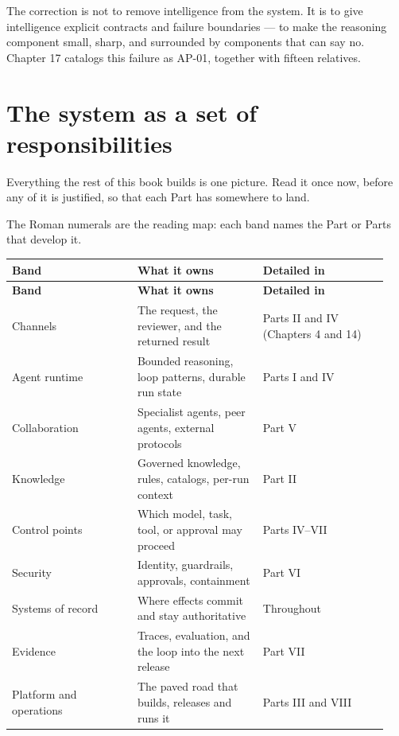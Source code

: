 The correction is not to remove intelligence from the system. It is to give intelligence explicit contracts and failure boundaries — to make the reasoning component small, sharp, and surrounded by components that can say no. Chapter 17 catalogs this failure as AP-01, together with fifteen relatives.\par

\section{The system as a set of responsibilities}

Everything the rest of this book builds is one picture. Read it once now, before any of it is justified, so that each Part has somewhere to land.\par


The Roman numerals are the reading map: each band names the Part or Parts that develop it.\par

\BookTableStart
\small
\begin{longtable}{@{}Y{0.3133\linewidth}Y{0.3133\linewidth}Y{0.3133\linewidth}@{}}
\color{white}\bfseries Band & \color{white}\bfseries What it owns & \color{white}\bfseries Detailed in \\
\endfirsthead
{}
\color{white}\bfseries Band & \color{white}\bfseries What it owns & \color{white}\bfseries Detailed in \\
\endhead
Channels & The request, the reviewer, and the returned result & Parts II and IV (Chapters 4 and 14) \\
Agent runtime & Bounded reasoning, loop patterns, durable run state & Parts I and IV \\
Collaboration & Specialist agents, peer agents, external protocols & Part V \\
Knowledge & Governed knowledge, rules, catalogs, per-run context & Part II \\
Control points & Which model, task, tool, or approval may proceed & Parts IV–VII \\
Security & Identity, guardrails, approvals, containment & Part VI \\
Systems of record & Where effects commit and stay authoritative & Throughout \\
Evidence & Traces, evaluation, and the loop into the next release & Part VII \\
Platform and operations & The paved road that builds, releases and runs it & Parts III and VIII \\
\end{longtable}
\BookTableEnd

